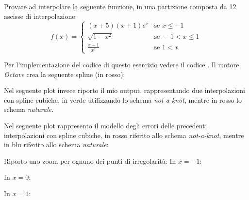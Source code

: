 \begin{exercise} 
Provare ad interpolare la seguente funzione, in una partizione composta da 12
ascisse di interpolazione:
\begin{displaymath}
f(x) = \left \lbrace 
\begin{matrix}
	(x+5)(x+1)e^{x} & \text{se } x \leq -1 \\
	\sqrt{1 - x^{2}} & \text{se } -1 < x \leq 1 \\
	\frac{x-1}{x^{2}} & \text{se } 1 < x
\end{matrix} 
\right. 
\end{displaymath}
\end{exercise}
Per l'implementazione del codice di questo esercizio vedere il codice
.
Il motore \emph{Octave} crea la seguente spline (in rosso):
\begin{center}   

\end{center}

Nel seguente plot invece riporto il mio output, rappresentando due
interpolazioni con spline cubiche, in verde utilizzando lo schema
\emph{not-a-knot}, mentre in rosso lo schema \emph{naturale}.
\begin{center}   

\end{center}
Nel seguente plot rappresento il modello degli errori delle precedenti
interpolazioni con spline cubiche, in rosso riferito allo
schema \emph{not-a-knot}, mentre in blu riferito allo schema \emph{naturale}:
% 
\begin{center}

\end{center}

Riporto uno zoom per ognuno dei punti di irregolarit\`a:
In $x = -1$:
\begin{center}   

\end{center}
In $x = 0$:
\begin{center}   

\end{center}
In $x = 1$:
\begin{center}   

\end{center}

